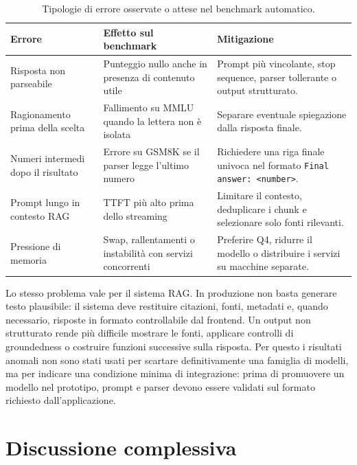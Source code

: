 \begin{table}[ht]
  \centering
  \caption{Tipologie di errore osservate o attese nel benchmark automatico.}
  \label{tab:output_error_types}
  \small
  \begin{tabularx}{\textwidth}{L{3.1cm}L{4.1cm}Y}
    \toprule
    \textbf{Errore} & \textbf{Effetto sul benchmark} & \textbf{Mitigazione} \\
    \midrule
    Risposta non parseabile & Punteggio nullo anche in presenza di contenuto
      utile &
      Prompt più vincolante, stop sequence, parser tollerante o output
      strutturato. \\
    Ragionamento prima della scelta & Fallimento su MMLU quando la lettera non
      è isolata &
      Separare eventuale spiegazione dalla risposta finale. \\
    Numeri intermedi dopo il risultato & Errore su GSM8K se il parser legge
      l'ultimo numero &
      Richiedere una riga finale univoca nel formato
      \texttt{Final answer: <number>}. \\
    Prompt lungo in contesto RAG & TTFT più alto prima dello streaming &
      Limitare il contesto, deduplicare i chunk e selezionare solo fonti
      rilevanti. \\
    Pressione di memoria & Swap, rallentamenti o instabilità con servizi
      concorrenti &
      Preferire Q4, ridurre il modello o distribuire i servizi su macchine
      separate. \\
    \bottomrule
  \end{tabularx}
\end{table}

Lo stesso problema vale per il sistema RAG. In produzione non basta generare
testo plausibile: il sistema deve restituire citazioni, fonti, metadati e,
quando necessario, risposte in formato controllabile dal frontend. Un output non
strutturato rende più difficile mostrare le fonti, applicare controlli di
groundedness o costruire funzioni successive sulla risposta. Per questo i
risultati anomali non sono stati usati per scartare definitivamente una famiglia
di modelli, ma per indicare una condizione minima di integrazione: prima di
promuovere un modello nel prototipo, prompt e parser devono essere validati sul
formato richiesto dall'applicazione.

\section{Discussione complessiva}
\label{sec:evaluation_discussion}

